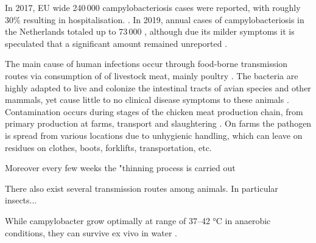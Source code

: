 In 2017, EU wide 240\,000 campylobacteriosis cases were reported, with roughly 30\%  resulting in hospitalisation. \parencite{european_centre_for_disease_prevention_and_control_european_2018}. In 2019, annual cases of campylobacteriosis in the Netherlands totaled up to 73\,000 \parencite{lagerweij_disease_2020}, although due its milder symptoms it is speculated that a significant amount remained unreported \parencite{koutsoumanis_update_2020}. 



The main cause of human infections occur through food-borne transmission routes via consumption of of livestock meat, mainly poultry \parencite{wilson_tracing_2008}. The bacteria are highly adapted to live and colonize the intestinal tracts of avian species and other mammals, yet cause little to no clinical disease symptoms to these animals \parencite{saif_diseases_2008}. Contamination occurs during stages of the chicken meat production chain, from primary production at farms, transport and slaughtering \parencite{skarp_campylobacteriosis_2015}. 
On farms the pathogen is spread from various locations due to unhygienic handling, which can leave on residues on
clothes, boots, forklifts, transportation, etc. 

Moreover every few weeks the "thinning process is carried out

There also exist several transmission routes among animals. In particular insects...

While campylobacter grow optimally at range of 37–42 °C \cite{bronowski_role_2014} in anaerobic conditions, they can survive ex vivo in water \cite{wilson_tracing_2008}. 

